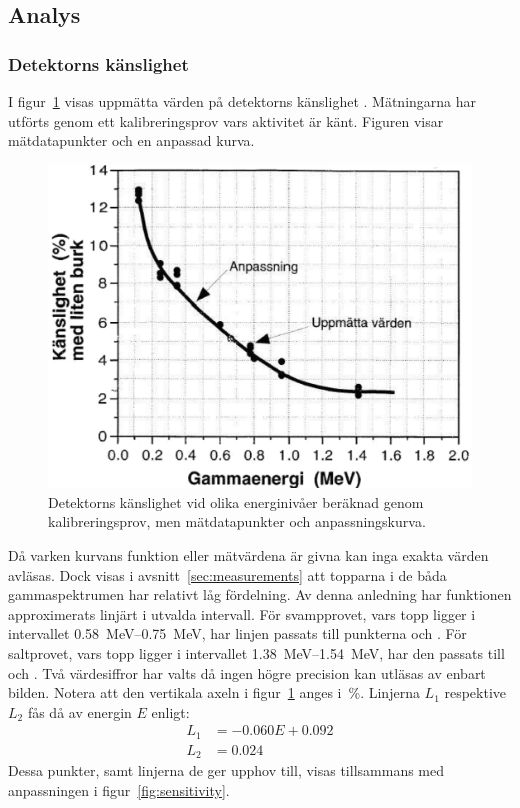 \subsection{Analys} \label{sec:analysis}

\subsubsection{Detektorns känslighet} \label{sec:sensitivity}

I figur~\ref{fig:sensitivityraw} visas uppmätta värden på detektorns
känslighet \parencite{instructions}. Mätningarna har utförts genom ett
kalibreringsprov vars aktivitet är känt. Figuren visar mätdatapunkter
och en anpassad kurva.

\begin{figure}[!hp]
    \centering
    \includegraphics[width=\textwidth, keepaspectratio]{../images/sensitivity_raw.png}
    \caption{
        Detektorns känslighet vid olika energinivåer beräknad genom
        kalibreringsprov, men mätdatapunkter och anpassningskurva.
    }
    \label{fig:sensitivityraw}
\end{figure}

Då varken kurvans funktion eller mätvärdena är givna kan inga exakta värden
avläsas. Dock visas i avsnitt~\ref{sec:measurements} att topparna i de båda
gammaspektrumen har relativt låg fördelning. Av denna anledning har funktionen
approximerats linjärt i utvalda intervall. För svampprovet, vars topp ligger i
intervallet \qtyrange{0.58}{0.75}{\MeV}, har linjen passats till punkterna
 och . För saltprovet, vars topp ligger i
intervallet \qtyrange{1.38}{1.54}{\MeV}, har den passats till 
och . Två värdesiffror har valts då ingen högre precision kan
utläsas av enbart bilden. Notera att den vertikala axeln i
figur~\ref{fig:sensitivityraw} anges i~\unit{\percent}. Linjerna $L_1$
respektive $L_2$ fås då av energin $E$ enligt:
%
\begin{align}
    L_1 &= \num{-0.060} E + \num{0.092} \label{eq:line1} \\
    L_2 &= \num{0.024}                 \label{eq:line2}
\end{align}
%
Dessa punkter, samt linjerna de ger upphov till, visas tillsammans med
anpassningen i figur~\ref{fig:sensitivity}.

